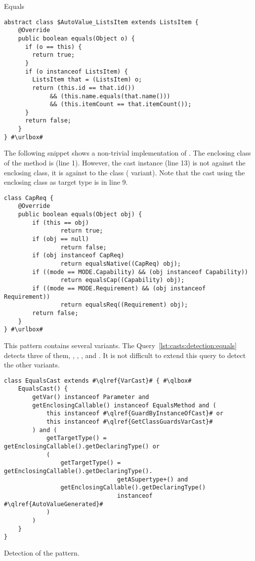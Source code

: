 \begin{pattern}{Equals}
\begin{verbatim}
abstract class $AutoValue_ListsItem extends ListsItem {
    @Override
    public boolean equals(Object o) {
      if (o == this) {
        return true;
      }
      if (o instanceof ListsItem) {
        ListsItem that = (ListsItem) o;
        return (this.id == that.id())
             && (this.name.equals(that.name()))
             && (this.itemCount == that.itemCount());
      }
      return false;
    }
} #\urlbox#
\end{verbatim}

The following snippet shows a non-trivial implementation of .
The enclosing class of the  method is  (line 1).
However, the cast instance (line 13) is not against the enclosing class,
it is against to the  class ( variant).
Note that the cast using the enclosing class as target type is in line 9.

\def\urlvar{http://bit.ly/bndtools_bnd_2SM5pOw}
\begin{verbatim}
class CapReq {
    @Override
    public boolean equals(Object obj) {
        if (this == obj)
                return true;
        if (obj == null)
                return false;
        if (obj instanceof CapReq)
                return equalsNative((CapReq) obj);
        if ((mode == MODE.Capability) && (obj instanceof Capability))
                return equalsCap((Capability) obj);
        if ((mode == MODE.Requirement) && (obj instanceof Requirement))
                return equalsReq((Requirement) obj);
        return false;
    }
} #\urlbox#
\end{verbatim}


\detection{}
This pattern contains several variants.
The Query~\ref{lst:casts:detection:equals} detects three of them, \ie{},
,
, and
.
It is not difficult to extend this query to detect the other variants. 

\begin{listing}
\begin{verbatim}
class EqualsCast extends #\qlref{VarCast}# { #\qlbox#
	EqualsCast() {
		getVar() instanceof Parameter and
		getEnclosingCallable() instanceof EqualsMethod and (
			this instanceof #\qlref{GuardByInstanceOfCast}# or
			this instanceof #\qlref{GetClassGuardsVarCast}#
		) and (
			getTargetType() = getEnclosingCallable().getDeclaringType() or
			(
				getTargetType() = getEnclosingCallable().getDeclaringType().
								getASupertype+() and
				getEnclosingCallable().getDeclaringType()
								instanceof #\qlref{AutoValueGenerated}# 
			)
		)
	}
}
\end{verbatim}
\caption{Detection of the \thisp{} pattern.}
\label{lst:casts:detection:equals}
\end{listing}



\end{pattern}

